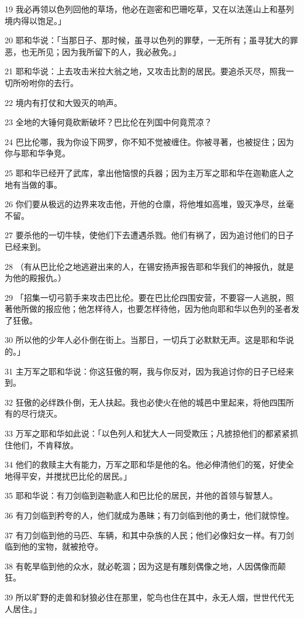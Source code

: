 \par 19 我必再领以色列回他的草场，他必在迦密和巴珊吃草，又在以法莲山上和基列境内得以饱足。」
\par 20 耶和华说：「当那日子、那时候，虽寻以色列的罪孽，一无所有；虽寻犹大的罪恶，也无所见；因为我所留下的人，我必赦免。」
\par 21 耶和华说：上去攻击米拉大翁之地，又攻击比割的居民。要追杀灭尽，照我一切所吩咐你的去行。
\par 22 境内有打仗和大毁灭的响声。
\par 23 全地的大锤何竟砍断破坏？巴比伦在列国中何竟荒凉？
\par 24 巴比伦哪，我为你设下网罗，你不知不觉被缠住。你被寻著，也被捉住；因为你与耶和华争竞。
\par 25 耶和华已经开了武库，拿出他恼恨的兵器；因为主万军之耶和华在迦勒底人之地有当做的事。
\par 26 你们要从极远的边界来攻击他，开他的仓廪，将他堆如高堆，毁灭净尽，丝毫不留。
\par 27 要杀他的一切牛犊，使他们下去遭遇杀戮。他们有祸了，因为追讨他们的日子已经来到。
\par 28 （有从巴比伦之地逃避出来的人，在锡安扬声报告耶和华我们的神报仇，就是为他的殿报仇。）
\par 29 「招集一切弓箭手来攻击巴比伦。要在巴比伦四围安营，不要容一人逃脱，照著他所做的报应他；他怎样待人，也要怎样待他，因为他向耶和华以色列的圣者发了狂傲。
\par 30 所以他的少年人必仆倒在街上。当那日，一切兵丁必默默无声。这是耶和华说的。」
\par 31 主万军之耶和华说：你这狂傲的啊，我与你反对，因为我追讨你的日子已经来到。
\par 32 狂傲的必绊跌仆倒，无人扶起。我也必使火在他的城邑中里起来，将他四围所有的尽行烧灭。
\par 33 万军之耶和华如此说：「以色列人和犹大人一同受欺压；凡掳掠他们的都紧紧抓住他们，不肯释放。
\par 34 他们的救赎主大有能力，万军之耶和华是他的名。他必伸清他们的冤，好使全地得平安，并搅扰巴比伦的居民。」
\par 35 耶和华说：有刀剑临到迦勒底人和巴比伦的居民，并他的首领与智慧人。
\par 36 有刀剑临到矜夸的人，他们就成为愚昧；有刀剑临到他的勇士，他们就惊惶。
\par 37 有刀剑临到他的马匹、车辆，和其中杂族的人民；他们必像妇女一样。有刀剑临到他的宝物，就被抢夺。
\par 38 有乾旱临到他的众水，就必乾涸；因为这是有雕刻偶像之地，人因偶像而颠狂。
\par 39 所以旷野的走兽和豺狼必住在那里，鸵鸟也住在其中，永无人烟，世世代代无人居住。」
